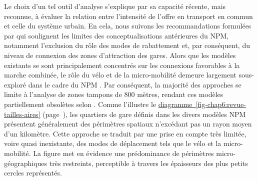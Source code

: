 \begin{refsegment}
Le choix d’un tel outil d’analyse s’explique par sa capacité récente, mais reconnue, à évaluer la relation entre l’intensité de l’offre en transport en commun et celle du système urbain. En cela, nous suivons les recommandations formulées par \textcolor{blue}{\textcite[111]{nigro_land_2019}} qui soulignent les limites des conceptualisations antérieures du \acrshort{NPM}, notamment l’exclusion du rôle des modes de \gls{rabattement} et, par conséquent, du niveau de connexion des zones d’attraction des gares. Alors que les modèles existants se sont principalement concentrés sur les connexions favorables à la marche combinée, le rôle du \gls{vélo} et de la \gls{micro-mobilité} demeure largement sous-exploré dans le cadre du \acrshort{NPM} \textcolor{blue}{\autocite[2]{zhang_make_2023}}. Par conséquent, la majorité des approches se limite à l’analyse de zones tampons de 800 mètres, rendant ces modèles partiellement obsolètes selon \textcolor{blue}{\textcite[12]{olaru_place_2019}}. Comme l’illustre le \hyperref[fig-chap6:revue-tailles-aires]{diagramme~\ref{fig-chap6:revue-tailles-aires}} (page~\pageref{fig-chap6:revue-tailles-aires}), les quartiers de gare définis dans les divers modèles \acrshort{NPM} présentent généralement des périmètres spatiaux n’excédant pas un rayon moyen d’un kilomètre. Cette approche se traduit par une prise en compte très limitée, voire quasi inexistante, des modes de déplacement tels que le vélo et la micro-mobilité. La figure met en évidence une prédominance de périmètres micro-géographiques très restreints, perceptible à travers les épaisseurs des plus petits cercles représentés.%


\end{refsegment}
